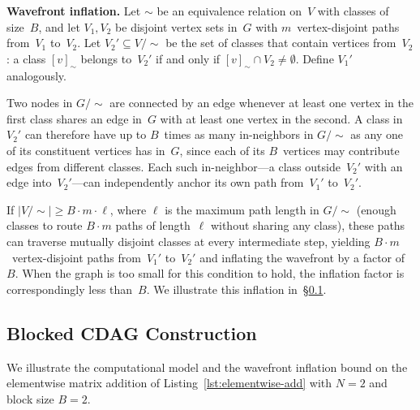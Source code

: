 \textbf{Wavefront inflation.}  Let $\sim$ be an equivalence relation on~$V$ with classes of size~$B$, and let $V_1, V_2$ be disjoint vertex sets in~$G$ with $m$~vertex-disjoint paths from~$V_1$ to~$V_2$.  Let $V_2' \subseteq V/{\sim}$ be the set of classes that contain vertices from~$V_2$: a class $[v]_{\sim}$ belongs to~$V_2'$ if and only if $[v]_{\sim} \cap V_2 \neq \emptyset$.  Define $V_1'$ analogously.

Two nodes in $G/{\sim}$ are connected by an edge whenever at least one vertex in the first class shares an edge in~$G$ with at least one vertex in the second.  A class in~$V_2'$ can therefore have up to $B$~times as many in-neighbors in $G/{\sim}$ as any one of its constituent vertices has in~$G$, since each of its $B$~vertices may contribute edges from different classes.  Each such in-neighbor---a class outside~$V_2'$ with an edge into~$V_2'$---can independently anchor its own path from~$V_1'$ to~$V_2'$.

If $|V/{\sim}| \geq B \cdot m \cdot \ell$, where $\ell$ is the maximum path length in $G/{\sim}$ (enough classes to route $B \cdot m$ paths of length~$\ell$ without sharing any class), these paths can traverse mutually disjoint classes at every intermediate step, yielding $B \cdot m$~vertex-disjoint paths from~$V_1'$ to~$V_2'$ and inflating the wavefront by a factor of~$B$.  When the graph is too small for this condition to hold, the inflation factor is correspondingly less than~$B$.  We illustrate this inflation in~\S\ref{sec:blocked_cdag}.



\subsection{Blocked CDAG Construction}\label{sec:blocked_cdag}

We illustrate the computational model and the wavefront inflation bound on the elementwise matrix addition of Listing~\ref{lst:elementwise-add} with $N = 2$ and block size $B = 2$.

